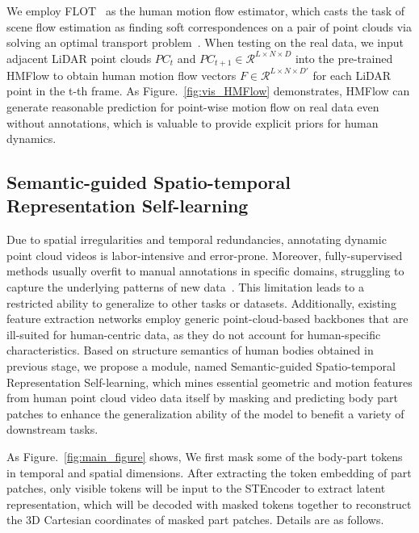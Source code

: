 We employ FLOT~\cite{puy2020flot} as the human motion flow estimator, which casts the task of scene flow estimation as finding soft correspondences on a pair of point clouds via solving an optimal transport problem~\cite{li2023deep}. When testing on the real data, we input adjacent LiDAR point clouds $PC_t$ and $PC_{t+1} \in \mathcal{R}^{L \times N \times D}$ into the pre-trained HMFlow to obtain human motion flow vectors $F \in \mathcal{R}^{L \times N \times D'}$ for each LiDAR point in the t-th frame. As Figure.~\ref{fig:vis_HMFlow} demonstrates, HMFlow can generate reasonable prediction for point-wise motion flow on real data even without annotations, which is valuable to provide explicit priors for human dynamics.



\subsection{Semantic-guided Spatio-temporal Representation Self-learning}
\label{subsec:STMaskRecon}
Due to spatial irregularities and temporal redundancies, annotating dynamic point cloud videos is labor-intensive and error-prone. Moreover, fully-supervised methods usually overfit to manual annotations in specific domains, struggling to capture the underlying patterns of new data~\cite{zeng2023self}. This limitation leads to a restricted ability to generalize to other tasks or datasets. Additionally, existing feature extraction networks employ generic point-cloud-based backbones that are ill-suited for human-centric data, as they do not account for human-specific characteristics.
Based on structure semantics of human bodies obtained in previous stage, we propose a module, named Semantic-guided Spatio-temporal Representation Self-learning, which mines essential geometric and motion features from human point cloud video data itself by masking and predicting body part patches to enhance the generalization ability of the model to benefit a variety of downstream tasks.

As Figure.~\ref{fig:main_figure} shows, We first mask some of the body-part tokens in temporal and spatial dimensions. After extracting the token embedding of part patches, only visible tokens will be input to the STEncoder to extract latent representation, which will be decoded with masked tokens together to reconstruct the 3D Cartesian coordinates of masked part patches. Details are as follows.




